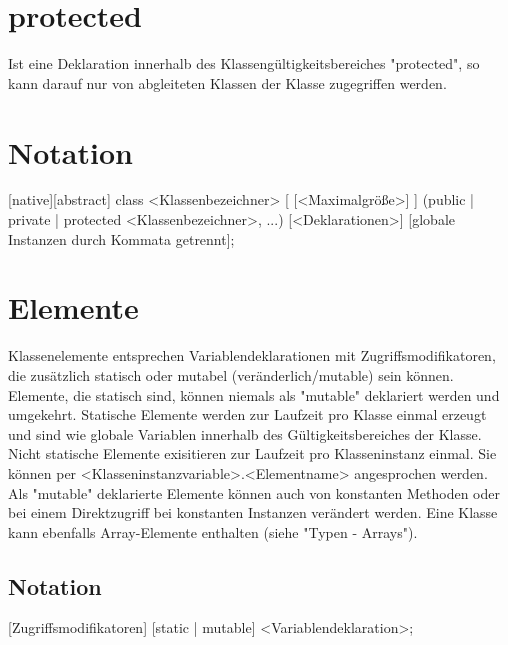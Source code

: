 \section{protected}
Ist eine Deklaration innerhalb des Klassengültigkeitsbereiches "protected", so kann darauf nur von abgleiteten Klassen
der Klasse zugegriffen werden.

\section{Notation}
[native][abstract] class <Klassenbezeichner> [ [<Maximalgröße>] ] (public | private | protected <Klassenbezeichner>, ...)
{
	[<Deklarationen>]
} [globale Instanzen durch Kommata getrennt];

\section{Elemente}
Klassenelemente entsprechen Variablendeklarationen mit Zugriffsmodifikatoren, die zusätzlich statisch oder mutabel (veränderlich/mutable) sein können.
Elemente, die statisch sind, können niemals als "mutable" deklariert werden und umgekehrt.
Statische Elemente werden zur Laufzeit pro Klasse einmal erzeugt und sind wie globale Variablen innerhalb des Gültigkeitsbereiches der Klasse.
Nicht statische Elemente exisitieren zur Laufzeit pro Klasseninstanz einmal.
Sie können per <Klasseninstanzvariable>.<Elementname> angesprochen werden.
Als "mutable" deklarierte Elemente können auch von konstanten Methoden oder bei einem Direktzugriff bei konstanten Instanzen verändert werden.
Eine Klasse kann ebenfalls Array-Elemente enthalten (siehe "Typen - Arrays").

\subsection{Notation}
[Zugriffsmodifikatoren] [static | mutable] <Variablendeklaration>;

